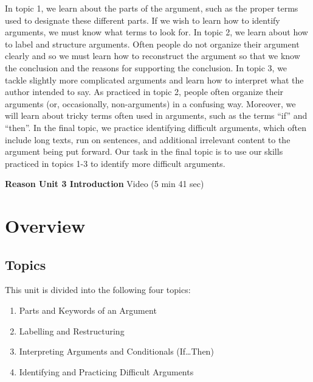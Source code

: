 \documentclass[
]{book}
\providecommand{\tightlist}{%
  \setlength{\itemsep}{0pt}\setlength{\parskip}{0pt}}
\begin{document}
In topic 1, we learn about the parts of the argument, such as the proper terms used to designate these different parts. If we wish to learn how to identify arguments, we must know what terms to look for. In topic 2, we learn about how to label and structure arguments. Often people do not organize their argument clearly and so we must learn how to reconstruct the argument so that we know the conclusion and the reasons for supporting the conclusion. In topic 3, we tackle slightly more complicated arguments and learn how to interpret what the author intended to say. As practiced in topic 2, people often organize their arguments (or, occasionally, non-arguments) in a confusing way. Moreover, we will learn about tricky terms often used in arguments, such as the terms ``if'' and ``then''. In the final topic, we practice identifying difficult arguments, which often include long texts, run on sentences, and additional irrelevant content to the argument being put forward. Our task in the final topic is to use our skills practiced in topics 1-3 to identify more difficult arguments.

\textbf{Reason Unit 3 Introduction} Video (5 min 41 sec)

\hypertarget{overview-2}{%
\section*{Overview}\label{overview-2}}

\hypertarget{topics-2}{%
\subsection*{Topics}\label{topics-2}}

This unit is divided into the following four topics:

\begin{enumerate}
\def\labelenumi{\arabic{enumi}.}
\tightlist
\item
  Parts and Keywords of an Argument\\
\item
  Labelling and Restructuring\\
\item
  Interpreting Arguments and Conditionals (If\ldots Then)\\
\item
  Identifying and Practicing Difficult Arguments
\end{enumerate}
\end{document}
